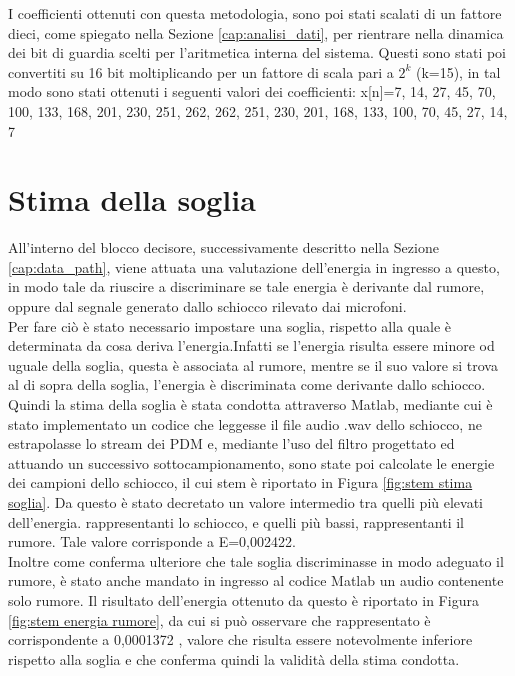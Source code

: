 \documentclass[a4paper, titlepage]{article}
\begin{document}
\noindent I coefficienti ottenuti con questa metodologia,  sono poi stati scalati di un fattore dieci, come spiegato nella Sezione \ref{cap:analisi_dati}, per rientrare nella dinamica dei bit di guardia scelti per l'aritmetica interna del sistema. Questi sono stati poi convertiti su 16 bit moltiplicando per un fattore di scala pari a $2^k$ (k=15), in tal modo sono stati ottenuti i seguenti valori dei coefficienti:
\newline
x[n]={7, 14, 27, 45, 70, 100, 133, 168, 201, 230, 251, 262, 262, 251, 230, 201, 168, 133, 100, 70, 45, 27, 14, 7}
\newline
\section{Stima della soglia}
All'interno del blocco decisore, successivamente descritto nella Sezione \ref{cap:data_path}, viene attuata una valutazione dell'energia in ingresso a questo, in modo tale da riuscire a discriminare se tale energia è derivante dal rumore, oppure dal segnale generato dallo schiocco rilevato dai microfoni.\\Per fare ciò è stato necessario impostare una soglia, rispetto alla quale è determinata da cosa deriva l'energia.Infatti se l'energia risulta essere minore od uguale della soglia, questa è associata al rumore, mentre se il suo valore si trova al di sopra della soglia, l'energia è discriminata come derivante dallo schiocco.\\
Quindi la stima della soglia è stata condotta attraverso Matlab, mediante cui è stato implementato un codice che leggesse il file audio .wav dello schiocco, ne estrapolasse lo stream dei PDM e, mediante l'uso del filtro progettato ed attuando un successivo sottocampionamento, sono state poi calcolate le energie dei campioni dello schiocco, il cui stem è riportato in Figura \ref{fig:stem stima soglia}. Da questo è stato decretato un valore intermedio tra quelli più elevati dell'energia. rappresentanti lo schiocco, e quelli più bassi, rappresentanti il rumore. Tale valore corrisponde a E=0,002422.\\Inoltre come conferma ulteriore che tale soglia discriminasse in modo adeguato il rumore, è stato anche mandato in ingresso al codice Matlab un audio contenente solo rumore. Il risultato dell'energia ottenuto da questo è riportato in Figura \ref{fig:stem energia rumore}, da cui si può osservare che rappresentato è corrispondente a 0,0001372 , valore che risulta essere notevolmente inferiore rispetto alla soglia e che conferma quindi la validità della stima condotta.
\end{document}
